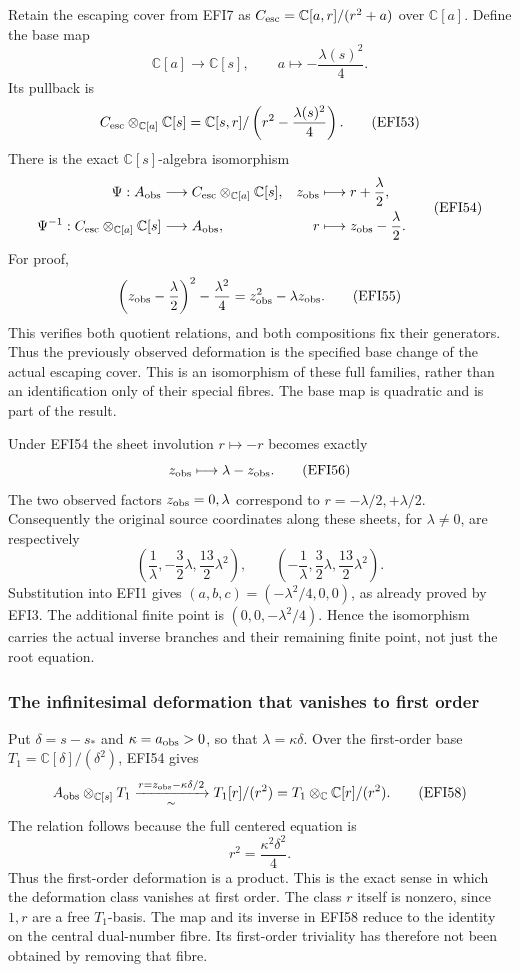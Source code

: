 \documentclass[
  10pt,
  a4paper,
]{article}
\begin{document}
Retain the escaping cover from EFI7 as
\(C_{\rm esc}=\mathbb C[a,r]/(r^2+a)\) over \(\mathbb C[a]\). Define the
base map \[
\mathbb C[a]\longrightarrow\mathbb C[s],\qquad
a\longmapsto-\frac{\lambda(s)^2}{4}.
\tag{EFI52}
\] Its pullback is \[
C_{\rm esc}\otimes_{\mathbb C[a]}\mathbb C[s]
=\mathbb C[s,r]/\left(r^2-\frac{\lambda(s)^2}{4}\right).
\tag{EFI53}
\] There is the exact \(\mathbb C[s]\)-algebra isomorphism \[
\begin{aligned}
\Psi:A_{\rm obs}&\longrightarrow
C_{\rm esc}\otimes_{\mathbb C[a]}\mathbb C[s],
&
z_{\rm obs}&\longmapsto r+\frac{\lambda}{2},\\
\Psi^{-1}:C_{\rm esc}\otimes_{\mathbb C[a]}\mathbb C[s]
&\longrightarrow A_{\rm obs},
&
r&\longmapsto z_{\rm obs}-\frac{\lambda}{2}.
\end{aligned}
\tag{EFI54}
\] For proof, \[
\left(z_{\rm obs}-\frac\lambda2\right)^2-\frac{\lambda^2}{4}
=z_{\rm obs}^2-\lambda z_{\rm obs}.
\tag{EFI55}
\] This verifies both quotient relations, and both compositions fix
their generators. Thus the previously observed deformation is the
specified base change of the actual escaping cover. This is an
isomorphism of these full families, rather than an identification only
of their special fibres. The base map is quadratic and is part of the
result.

Under EFI54 the sheet involution \(r\mapsto-r\) becomes exactly \[
z_{\rm obs}\longmapsto\lambda-z_{\rm obs}.
\tag{EFI56}
\] The two observed factors \(z_{\rm obs}=0,\lambda\) correspond to
\(r=-\lambda/2,+\lambda/2\). Consequently the original source
coordinates along these sheets, for \(\lambda\ne0\), are respectively \[
\left(\frac1\lambda,-\frac32\lambda,\frac{13}2\lambda^2\right),
\qquad
\left(-\frac1\lambda,\frac32\lambda,\frac{13}2\lambda^2\right).
\tag{EFI57}
\] Substitution into EFI1 gives \((a,b,c)=(-\lambda^2/4,0,0)\), as
already proved by EFI3. The additional finite point is
\((0,0,-\lambda^2/4)\). Hence the isomorphism carries the actual inverse
branches and their remaining finite point, not just the root equation.

\subsubsection{The infinitesimal deformation that vanishes to first
order}\label{the-infinitesimal-deformation-that-vanishes-to-first-order}

Put \(\delta=s-s_*\) and \(\kappa=a_{\rm obs}>0\), so that
\(\lambda=\kappa\delta\). Over the first-order base
\(T_1=\mathbb C[\delta]/(\delta^2)\), EFI54 gives \[
A_{\rm obs}\otimes_{\mathbb C[s]}T_1
\xrightarrow[\sim]{r=z_{\rm obs}-\kappa\delta/2}
T_1[r]/(r^2)
 =T_1\otimes_{\mathbb C}\mathbb C[r]/(r^2).
\tag{EFI58}
\] The relation follows because the full centered equation is \[
r^2=\frac{\kappa^2\delta^2}{4}.
\tag{EFI59}
\] Thus the first-order deformation is a product. This is the exact
sense in which the deformation class vanishes at first order. The class
\(r\) itself is nonzero, since \(1,r\) are a free \(T_1\)-basis. The map
and its inverse in EFI58 reduce to the identity on the central
dual-number fibre. Its first-order triviality has therefore not been
obtained by removing that fibre.
\end{document}
